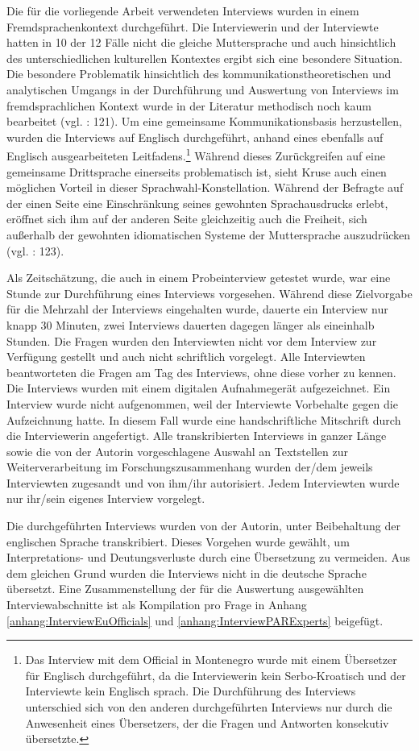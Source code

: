 Die für die vorliegende Arbeit verwendeten Interviews wurden in einem Fremdsprachenkontext durchgeführt. Die Interviewerin und der Interviewte hatten in 10 der 12 Fälle nicht die gleiche Muttersprache und auch hinsichtlich des unterschiedlichen kulturellen Kontextes ergibt sich eine besondere Situation. Die besondere Problematik hinsichtlich des kommunikationstheoretischen und analytischen Umgangs in der Durchführung und Auswertung von Interviews im fremdsprachlichen Kontext wurde in der Literatur methodisch noch kaum bearbeitet (vgl. \cite{kruse} : 121). Um eine gemeinsame Kommunikationsbasis herzustellen, wurden die Interviews auf Englisch durchgeführt, anhand eines ebenfalls auf Englisch ausgearbeiteten Leitfadens.\footnote{Das Interview mit dem Official in Montenegro wurde mit einem Übersetzer für Englisch durchgeführt, da die Interviewerin kein Serbo-Kroatisch und der Interviewte kein Englisch sprach. Die Durchführung des Interviews unterschied sich von den anderen durchgeführten Interviews nur durch die Anwesenheit eines Übersetzers, der die Fragen und Antworten konsekutiv übersetzte.} Während dieses Zurückgreifen auf eine gemeinsame Drittsprache einerseits problematisch ist, sieht Kruse auch einen möglichen Vorteil in dieser Sprachwahl-Konstellation. Während der Befragte auf der einen Seite eine Einschränkung seines gewohnten Sprachausdrucks erlebt, eröffnet sich ihm auf der anderen Seite gleichzeitig auch die Freiheit, sich außerhalb der gewohnten idiomatischen Systeme der Muttersprache auszudrücken (vgl. \cite{kruse} : 123). \par
Als Zeitschätzung, die auch in einem Probeinterview getestet wurde, war eine Stunde zur Durchführung eines Interviews vorgesehen. Während diese Zielvorgabe für die Mehrzahl der Interviews eingehalten wurde, dauerte ein Interview nur knapp 30 Minuten, zwei Interviews dauerten dagegen länger als eineinhalb Stunden. Die Fragen wurden den Interviewten nicht vor dem Interview zur Verfügung gestellt und auch nicht schriftlich vorgelegt. Alle Interviewten beantworteten die Fragen am Tag des Interviews, ohne diese vorher zu kennen. Die Interviews wurden mit einem digitalen Aufnahmegerät aufgezeichnet. Ein Interview wurde nicht aufgenommen, weil der Interviewte Vorbehalte gegen die Aufzeichnung hatte. In diesem Fall wurde eine handschriftliche Mitschrift durch die Interviewerin angefertigt. Alle transkribierten Interviews in ganzer Länge sowie die von der Autorin vorgeschlagene Auswahl an Textstellen zur Weiterverarbeitung im Forschungszusammenhang wurden der/dem jeweils Interviewten zugesandt und von ihm/ihr autorisiert. Jedem Interviewten wurde nur ihr/sein eigenes Interview vorgelegt.\par
Die durchgeführten Interviews wurden von der Autorin, unter Beibehaltung der englischen Sprache transkribiert. Dieses Vorgehen wurde gewählt, um Interpretations- und Deutungsverluste durch eine Übersetzung zu vermeiden. Aus dem gleichen Grund wurden die Interviews nicht in die deutsche Sprache übersetzt. Eine Zusammenstellung der für die Auswertung ausgewählten Interviewabschnitte ist als Kompilation pro Frage in Anhang \ref{anhang:InterviewEuOfficials} und \ref{anhang:InterviewPARExperts} beigefügt.

